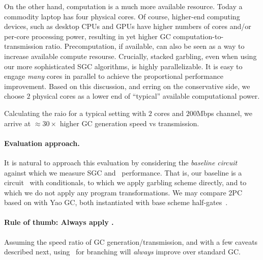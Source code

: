 On the other hand, computation is a much more available resource.  Today a commodity laptop has four physical cores. Of course, higher-end computing devices, such as desktop CPUs and GPUs have higher numbers of cores and/or per-core processing power,
resulting in yet higher GC computation-to-transmission ratio.  Precomputation, if available, can also be seen as a way to increase available compute resourse.
Crucially, stacked garbling,  even when using our more sophisticated SGC algorithms, is highly parallelizable.
It is easy to
engage \emph{many} cores in parallel  to achieve the proportional performance improvement.
%
Based on this discussion, and erring on the conservative side, we choose $2$ physical cores as a lower end of ``typical'' available computational power. 

Calculating the raio for a typical setting with $2$ cores and $200$Mbps channel, we arrive at 
$\approx 30 \times$ higher GC generation speed vs transmission.
%

%
%






\paragraph{Evaluation approach.}  It is natural to approach this
evaluation by considering the {\em baseline circuit} against which we
measure SGC and \ourschemelong\ performance.    That is, our baseline is a
circuit \cir\ with conditionals, to which we apply garbling scheme
directly, and to which we do not apply any program transformations.
We may compare 2PC based on \ourschemelong with  Yao GC, both instantiated
with base scheme half-gates~\cite{EC:ZahRosEva15}.



\paragraph{Rule of thumb: Always apply \ourscheme.}  Assuming the
speed ratio of GC generation/transmission, and with a few caveats
described next, using \ourschemelong\ for branching will {\em always}
improve over standard GC. 

